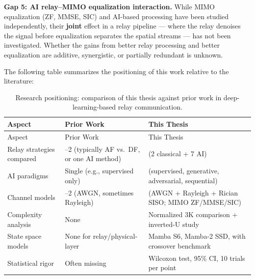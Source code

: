 \textbf{Gap 5: AI relay--MIMO equalization interaction.} While MIMO equalization (ZF, MMSE, SIC) and AI-based processing have been studied independently, their \textbf{joint} effect in a relay pipeline --- where the relay denoises the signal before equalization separates the spatial streams --- has not been investigated. Whether the gains from better relay processing and better equalization are additive, synergistic, or partially redundant is unknown.

The following table summarizes the positioning of this work relative to the literature:

\begin{longtable}[]{@{}
  >{\raggedright\arraybackslash}p{}
  >{\raggedright\arraybackslash}p{}
  >{\raggedright\arraybackslash}p{}@{}}
\caption{Research positioning: comparison of this thesis against prior work in deep-learning-based relay communication.}\label{tbl:table17}\tabularnewline
\toprule\noalign{}
\begin{minipage}[b]{\linewidth}\raggedright
Aspect
\end{minipage} & \begin{minipage}[b]{\linewidth}\raggedright
Prior Work
\end{minipage} & \begin{minipage}[b]{\linewidth}\raggedright
This Thesis
\end{minipage} \\
\midrule\noalign{}
\endfirsthead
\toprule\noalign{}
\begin{minipage}[b]{\linewidth}\raggedright
Aspect
\end{minipage} & \begin{minipage}[b]{\linewidth}\raggedright
Prior Work
\end{minipage} & \begin{minipage}[b]{\linewidth}\raggedright
This Thesis
\end{minipage} \\
\midrule\noalign{}
\endhead
\bottomrule\noalign{}
\endlastfoot
Relay strategies compared & 1--2 (typically AF vs.~DF, or one AI method) & 9 (2 classical + 7 AI) \\
AI paradigms & Single (e.g., supervised only) & 4 (supervised, generative, adversarial, sequential) \\
Channel models & 1--2 (AWGN, sometimes Rayleigh) & 6 (AWGN + Rayleigh + Rician SISO; MIMO ZF/MMSE/SIC) \\
Complexity analysis & None & Normalized 3K comparison + inverted-U study \\
State space models & None for relay/physical-layer & Mamba S6, Mamba-2 SSD, with crossover benchmark \\
Statistical rigor & Often missing & Wilcoxon test, 95\% CI, 10 trials per point \\
\end{longtable}

